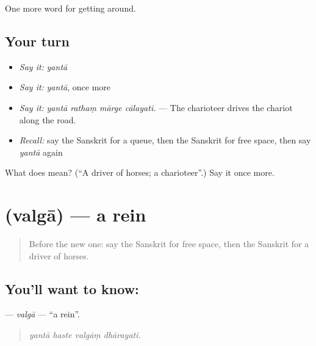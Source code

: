 \begin{grammarlens}[title={What you've built}]
One more word for getting around.
\end{grammarlens}

\subsection*{Your turn}
\begin{itemize}
\raggedright
  \item \emph{Say it:} \emph{yantā}
  \item \emph{Say it:} \emph{yantā}, once more
  \item \emph{Say it:} \emph{yantā rathaṃ mārge cālayati.} — The charioteer drives the chariot along the road.
  \item \emph{Recall:} say the Sanskrit for a queue, then the Sanskrit for free space, then say \emph{yantā} again
\end{itemize}

\begin{tcolorbox}[breakable,colback=teal!4,colframe=teal!35!black,title={Before you move on}]
What does  mean? (\textquotedblleft{}A driver of horses; a charioteer\textquotedblright{}.) Say it once more.
\end{tcolorbox}
\section[\texorpdfstring{\sk{वल्गा} (valgā)}{वल्गा (valgā)}]{ (valgā) — a rein}

\label{lesson:SA-C407-valga}



\begin{quote}
Before the new one: say the Sanskrit for free space, then the Sanskrit for a driver of horses.
\end{quote}

\subsection*{You'll want to know: }
\textbf{} — \emph{valgā} — \textquotedblleft{}a rein\textquotedblright{}.

\begin{quote}
   
\end{quote}

\begin{quote}
\emph{yantā haste valgāṃ dhārayati.}
\end{quote}

